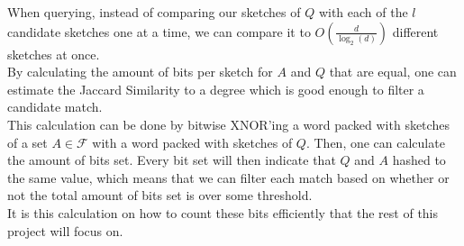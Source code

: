 When querying, instead of comparing our sketches of $Q$ with each of the $l$ candidate sketches one at a time, we can compare it to $O(\frac{d}{\log_2(d)})$ different sketches at once. \\
By calculating the amount of bits per sketch for $A$ and $Q$ that are equal, one can estimate the Jaccard Similarity to a degree which is good enough to filter a candidate match.\\
This calculation can be done by bitwise XNOR'ing a word packed with sketches of a set $A\in \mathcal{F}$ with a word packed with sketches of $Q$. Then, one can calculate the amount of bits set. Every bit set will then indicate that $Q$ and $A$ hashed to the same value, which means that we can filter each match based on whether or not the total amount of bits set is over some threshold.\\
It is this calculation on how to count these bits efficiently that the rest of this project will focus on.
